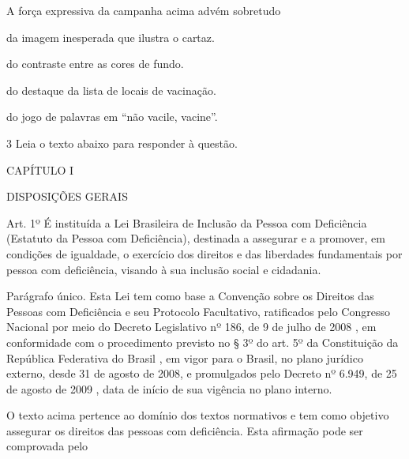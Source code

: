A força expressiva da campanha acima advém sobretudo 

\begin{escolha}
    
    \item da imagem inesperada que ilustra o cartaz.
    
    \item do contraste entre as cores de fundo. 
    
    \item do destaque da lista de locais de vacinação. 
    
    \item do jogo de palavras em ``não vacile, vacine''.

\end{escolha}

\num{3} Leia o texto abaixo para responder à questão. 

\begin{myquote}

CAPÍTULO I

DISPOSIÇÕES GERAIS

Art. 1º É instituída a Lei Brasileira de Inclusão da Pessoa com
Deficiência (Estatuto da Pessoa com Deficiência), destinada a assegurar
e a promover, em condições de igualdade, o exercício dos direitos e das
liberdades fundamentais por pessoa com deficiência, visando à sua
inclusão social e cidadania.

Parágrafo único. Esta Lei tem como base a Convenção sobre os Direitos
das Pessoas com Deficiência e seu Protocolo Facultativo, ratificados
pelo Congresso Nacional por meio do Decreto Legislativo nº 186, de 9 de
julho de 2008 , em conformidade com o procedimento previsto no § 3º do
art. 5º da Constituição da República Federativa do Brasil , em vigor
para o Brasil, no plano jurídico externo, desde 31 de agosto de 2008, e
promulgados pelo Decreto nº 6.949, de 25 de agosto de 2009 , data de
início de sua vigência no plano interno.

\end{myquote}


O texto acima pertence ao domínio dos textos normativos e tem como
objetivo assegurar os direitos das pessoas com deficiência. Esta
afirmação pode ser comprovada pelo

